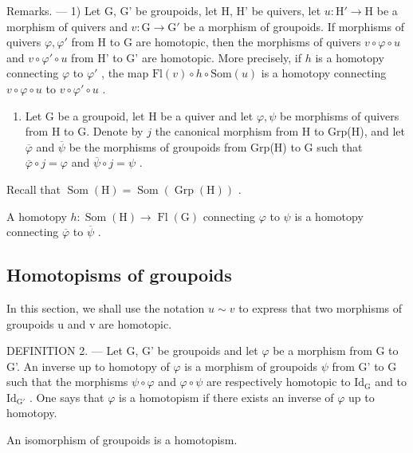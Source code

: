 Remarks. --- 1) Let G, G' be groupoids, let H, H' be quivers, let \(u\colon\mathrm{H}'\to\mathrm{H}\) be a morphism of quivers and \(v\colon\mathrm{G}\to\mathrm{G}'\) be a morphism of groupoids. If morphisms of quivers \(\varphi,\varphi'\) from H to G are homotopic, then the morphisms of quivers \(v\circ\varphi\circ u\) and \(v\circ\varphi'\circ u\) from H' to G' are homotopic. More precisely, if \(h\) is a homotopy connecting \(\varphi\) to \(\varphi'\) , the map \(\mathrm{Fl}(v)\circ h\circ\mathrm{Som}(u)\) is a homotopy connecting \(v\circ\varphi\circ u\) to \(v\circ\varphi'\circ u\) .

\begin{enumerate}
\def\labelenumi{\arabic{enumi})}
\setcounter{enumi}{1}
\tightlist
\item
  Let G be a groupoid, let H be a quiver and let \(\varphi, \psi\) be morphisms of quivers from H to G. Denote by \(j\) the canonical morphism from H to Grp(H), and let \(\overline{\varphi}\) and \(\overline{\psi}\) be the morphisms of groupoids from Grp(H) to G such that \(\overline{\varphi} \circ j = \varphi\) and \(\overline{\psi} \circ j = \psi\) .
\end{enumerate}

Recall that \(\operatorname{Som}(\mathrm{H}) = \operatorname{Som}(\operatorname{Grp}(\mathrm{H}))\) .

A homotopy \(h\colon \operatorname{Som}(\mathrm{H})\to \operatorname{Fl}(\mathrm{G})\) connecting \(\varphi\) to \(\psi\) is a homotopy connecting \(\overline{\varphi}\) to \(\overline{\psi}\) .

\subsection{Homotopisms of groupoids}

In this section, we shall use the notation \(u \sim v\) to express that two morphisms of groupoids u and v are homotopic.

DEFINITION 2. --- Let G, G' be groupoids and let \(\varphi\) be a morphism from G to G'. An inverse up to homotopy of \(\varphi\) is a morphism of groupoids \(\psi\) from G' to G such that the morphisms \(\psi \circ \varphi\) and \(\varphi \circ \psi\) are respectively homotopic to \(\mathrm{Id}_{\mathrm{G}}\) and to \(\mathrm{Id}_{\mathrm{G}'}\) . One says that \(\varphi\) is a homotopism if there exists an inverse of \(\varphi\) up to homotopy.

An isomorphism of groupoids is a homotopism.

